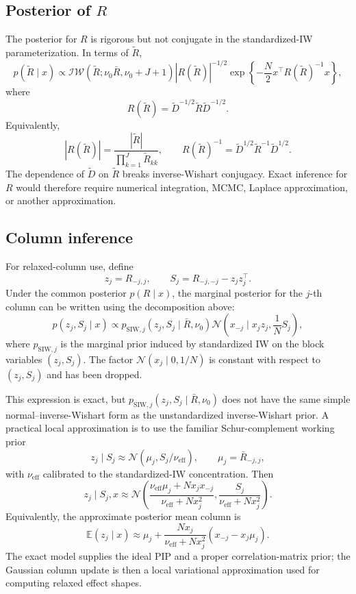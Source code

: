 \documentclass[11pt]{article}
\newcommand{\Rbar}{\bar R}
\newcommand{\E}{\mathbb E}
\newcommand{\Normal}{\mathcal N}
\begin{document}
\subsection*{Posterior of \(R\)}

The posterior for \(R\) is rigorous but not conjugate in the standardized-IW
parameterization. In terms of \(\tilde R\),
\[
p(\tilde R\mid x)
\propto
\mathcal{IW}(\tilde R;\nu_0\Rbar,\nu_0+J+1)
|R(\tilde R)|^{-1/2}
\exp\left\{
-\frac{N}{2}x^\top R(\tilde R)^{-1}x
\right\},
\]
where
\[
R(\tilde R)=\tilde D^{-1/2}\tilde R\tilde D^{-1/2}.
\]
Equivalently,
\[
|R(\tilde R)|
=
\frac{|\tilde R|}{\prod_{k=1}^J\tilde R_{kk}},
\qquad
R(\tilde R)^{-1}
=
\tilde D^{1/2}\tilde R^{-1}\tilde D^{1/2}.
\]
The dependence of \(\tilde D\) on \(\tilde R\) breaks inverse-Wishart
conjugacy. Exact inference for \(R\) would therefore require numerical
integration, MCMC, Laplace approximation, or another approximation.

\subsection*{Column inference}

For relaxed-column use, define
\[
z_j=R_{-j,j},
\qquad
S_j=R_{-j,-j}-z_jz_j^\top.
\]
Under the common posterior \(p(R\mid x)\), the marginal posterior for the
\(j\)-th column can be written using the decomposition above:
\[
p(z_j,S_j\mid x)
\propto
p_{\mathrm{SIW},j}(z_j,S_j\mid\Rbar,\nu_0)
\Normal\left(
x_{-j}\mid x_jz_j,\frac{1}{N}S_j
\right),
\]
where \(p_{\mathrm{SIW},j}\) is the marginal prior induced by standardized IW
on the block variables \((z_j,S_j)\). The factor
\(\Normal(x_j\mid0,1/N)\) is constant with respect to \((z_j,S_j)\) and has
been dropped.

This expression is exact, but \(p_{\mathrm{SIW},j}(z_j,S_j\mid\Rbar,\nu_0)\)
does not have the same simple normal--inverse-Wishart form as the
unstandardized inverse-Wishart prior. A practical local approximation is to use
the familiar Schur-complement working prior
\[
z_j\mid S_j
\approx
\Normal(\mu_j,S_j/\nu_{\mathrm{eff}}),
\qquad
\mu_j=\Rbar_{-j,j},
\]
with \(\nu_{\mathrm{eff}}\) calibrated to the standardized-IW concentration.
Then
\[
z_j\mid S_j,x
\approx
\Normal\left(
\frac{\nu_{\mathrm{eff}}\mu_j+Nx_jx_{-j}}
{\nu_{\mathrm{eff}}+Nx_j^2},
\frac{S_j}{\nu_{\mathrm{eff}}+Nx_j^2}
\right).
\]
Equivalently, the approximate posterior mean column is
\[
\E(z_j\mid x)
\approx
\mu_j+
\frac{Nx_j}{\nu_{\mathrm{eff}}+Nx_j^2}
(x_{-j}-x_j\mu_j).
\]
The exact model supplies the ideal PIP and a proper correlation-matrix prior;
the Gaussian column update is then a local variational approximation used for
computing relaxed effect shapes.
\end{document}
